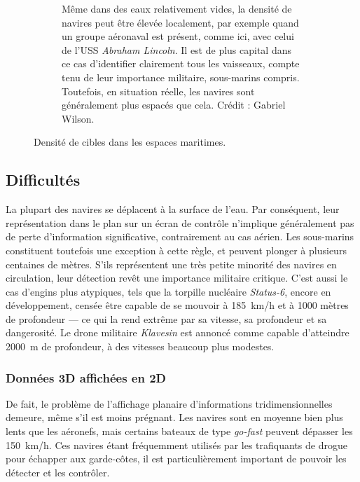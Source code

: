 \begin{figure}[htbp]
\begin{subfigure}[t]{0.58\textwidth}
			\caption[Le groupe aéronaval de l'USS \emph{Abraham Lincoln}]{Même dans des eaux relativement vides, la densité de navires peut être élevée localement, par exemple quand un groupe aéronaval est présent, comme ici, avec celui de l'USS \emph{Abraham Lincoln}. Il est de plus capital dans ce cas d'identifier clairement tous les vaisseaux, compte tenu de leur importance militaire, sous-marins compris. Toutefois, en situation réelle, les navires sont généralement plus espacés que cela. Crédit : Gabriel Wilson.}
			\label{fig:lincoln}
		\end{subfigure}
		\label{fig:muddyWaters}
		\caption{Densité de cibles dans les espaces maritimes.}
	\end{figure}
	
	\subsection{Difficultés}
	La plupart des navires se déplacent à la surface de l'eau. Par conséquent, leur représentation dans le plan sur un écran de contrôle n'implique généralement pas de perte d'information significative, contrairement au cas aérien. Les sous-marins constituent toutefois une exception à cette règle, et peuvent plonger à plusieurs centaines de mètres. S'ils représentent une très petite minorité des navires en circulation, leur détection revêt une importance militaire critique. C'est aussi le cas d'engins plus atypiques, tels que la torpille nucléaire \emph{Status-6},\footnotemark{} encore en développement, censée être capable de se mouvoir à 185~km/h et à 1000 mètres de profondeur --- ce qui la rend extrême par sa vitesse, sa profondeur et sa dangerosité. Le drone militaire \emph{Klavesin} est annoncé comme capable d'atteindre 2000~m de profondeur, à des vitesses beaucoup plus modestes.
	
	
	\subsubsection{Données 3D affichées en 2D}
	De fait, le problème de l'affichage planaire d'informations tridimensionnelles demeure, même s'il est moins prégnant. Les navires sont en moyenne bien plus lents que les aéronefs, mais certains bateaux de type \emph{go-fast} peuvent dépasser les 150~km/h. Ces navires étant fréquemment utilisés par les trafiquants de drogue pour échapper aux garde-côtes, il est particulièrement important de pouvoir les détecter et les contrôler.
	
